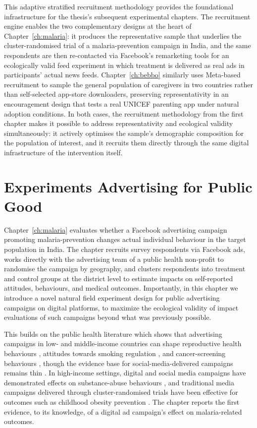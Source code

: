 This adaptive stratified recruitment methodology provides the foundational infrastructure for the thesis's subsequent experimental chapters. The recruitment engine enables the two complementary designs at the heart of Chapter~\ref{ch:malaria}: it produces the representative sample that underlies the cluster-randomised trial of a malaria-prevention campaign in India, and the same respondents are then re-contacted via Facebook's remarketing tools for an ecologically valid feed experiment in which treatment is delivered as real ads in participants' actual news feeds. Chapter~\ref{ch:bebbo} similarly uses Meta-based recruitment to sample the general population of caregivers in two countries rather than self-selected app-store downloaders, preserving representativity in an encouragement design that tests a real UNICEF parenting app under natural adoption conditions. In both cases, the recruitment methodology from the first chapter makes it possible to address representativity and ecological validity simultaneously: it actively optimises the sample's demographic composition for the population of interest, and it recruits them directly through the same digital infrastructure of the intervention itself. 

\section{Experiments Advertising for Public Good}
\label{sec:intro:advertising}

Chapter~\ref{ch:malaria} evaluates whether a Facebook advertising campaign promoting malaria-prevention changes actual individual behaviour in the target population in India. The chapter recruits survey respondents via Facebook ads, works directly with the advertising team of a public health non-profit to randomise the campaign by geography, and clusters respondents into treatment and control groups at the district level to estimate impacts on self-reported attitudes, behaviours, and medical outcomes. Importantly, in this chapter we introduce a novel natural field experiment design for public advertising campaigns on digital platforms, to maximize the ecological validity of impact evaluations of such campaigns beyond what was previously possible. 

This builds on the public health literature which shows that advertising campaigns in low- and middle-income countries can shape reproductive health behaviours \citep{Agha2012}, attitudes towards smoking regulation \citep{Alday2010}, and cancer-screening behaviours \citep{Wichachai2016}, though the evidence base for social-media-delivered campaigns remains thin \citep{Schmidtke2021}. In high-income settings, digital and social media campaigns have demonstrated effects on substance-abuse behaviours \citep{Evans2020}, and traditional media campaigns delivered through cluster-randomised trials have been effective for outcomes such as childhood obesity prevention \citep{Croker2012}. The chapter reports the first evidence, to its knowledge, of a digital ad campaign's effect on malaria-related outcomes. 

